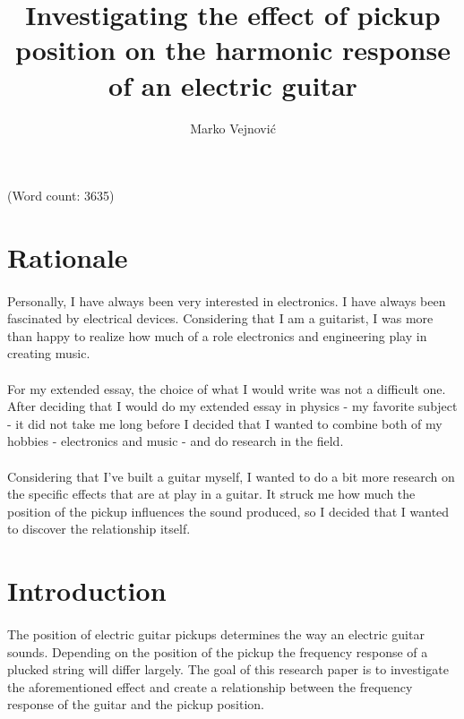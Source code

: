 \documentclass{article}
\title{Investigating the effect of pickup position on the harmonic response of 
an electric guitar}
\author{Marko Vejnovi\'{c}}
\begin{document}
\maketitle
\begin{flushright}
	(Word count: 3635)
\end{flushright}

\tableofcontents

\pagebreak


\section{Rationale}

\paragraph*{}
Personally, I have always been very interested in electronics. I have always
been fascinated by electrical devices. Considering that I am a guitarist, I was
more than happy to realize how much of a role electronics and engineering play
in creating music.

\paragraph*{}
For my extended essay, the choice of what I would write was not a difficult
one. After deciding that I would do my extended essay in physics - my favorite
subject - it did not take me long before I decided that I wanted to combine
both of my hobbies - electronics and music - and do research in the field.

\paragraph*{}
Considering that I've built a guitar myself, I wanted to do a bit more research
on the specific effects that are at play in a guitar. It struck me how much the
position of the pickup influences the sound produced, so I decided that I
wanted to discover the relationship itself.

\section{Introduction}

\paragraph*{}
The position of electric guitar pickups determines the way an electric guitar
sounds. Depending on the position of the pickup the frequency response of a
plucked string will differ largely. The goal of this research paper is to
investigate the aforementioned effect and create a relationship between the
frequency response of the guitar and the pickup position.
\end{document}
